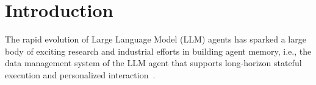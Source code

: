 \documentclass{llmxive}
\providecommand{\zw}[1]{#1}
\providecommand{\zxh}[1]{#1}
\begin{document}
\begin{abstract}
\end{abstract}
\section{Introduction}
\label{sec:intro}

The rapid evolution of Large Language Model (LLM) agents has sparked a large body of exciting research and industrial efforts in building agent memory, i.e., the data management system of the LLM agent that supports long-horizon stateful execution and personalized interaction~\cite{luo2026data,khan2026rag,liu2026supporting,singh2024personal,openai2026agents,microsoft2025copilot,google2025adk}. 
\end{document}
